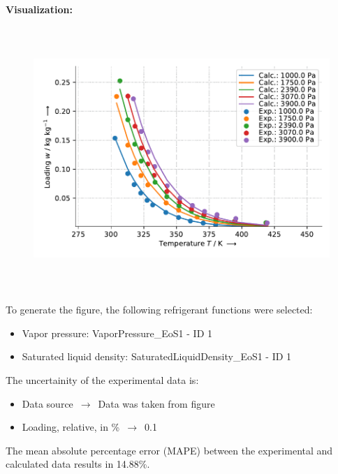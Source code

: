 \textbf{Visualization:}
%
\begin{figure}[!htp]
{\noindent\includegraphics[height=10cm, keepaspectratio]{figs/ads/ads_Water_silica_gel_pellet_Siogel_DubininAstakhov_1.pdf}}
\end{figure}
%

To generate the figure, the following refrigerant functions were selected:
\begin{itemize}
\item Vapor pressure: VaporPressure\_EoS1 - ID 1
\item Saturated liquid density: SaturatedLiquidDensity\_EoS1 - ID 1
\end{itemize}

The uncertainity of the experimental data is:
\begin{itemize}
\item Data source $\,\to\,$ Data was taken from figure
\item Loading, relative, in \% $\,\to\,$ 0.1
\end{itemize}

The mean absolute percentage error (MAPE) between the experimental and calculated data results in 14.88\%.
\FloatBarrier
\newpage
